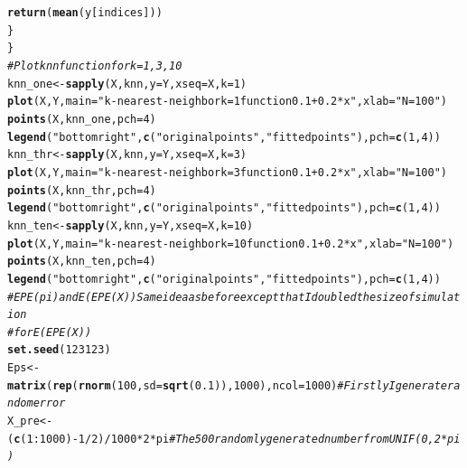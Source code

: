 \documentclass{article}\usepackage[]{graphicx}\usepackage[]{color}
\makeatletter
\newcommand{\hlnum}[1]{\textcolor[rgb]{0.686,0.059,0.569}{#1}}%
\newcommand{\hlstr}[1]{\textcolor[rgb]{0.192,0.494,0.8}{#1}}%
\newcommand{\hlcom}[1]{\textcolor[rgb]{0.678,0.584,0.686}{\textit{#1}}}%
\newcommand{\hlopt}[1]{\textcolor[rgb]{0,0,0}{#1}}%
\newcommand{\hlstd}[1]{\textcolor[rgb]{0.345,0.345,0.345}{#1}}%
\newcommand{\hlkwb}[1]{\textcolor[rgb]{0.69,0.353,0.396}{#1}}%
\newcommand{\hlkwc}[1]{\textcolor[rgb]{0.333,0.667,0.333}{#1}}%
\newcommand{\hlkwd}[1]{\textcolor[rgb]{0.737,0.353,0.396}{\textbf{#1}}}%
\newenvironment{kframe}{%
 \def\at@end@of@kframe{}%
 \ifinner\ifhmode%
  \def\at@end@of@kframe{\end{minipage}}%
  \begin{minipage}{\columnwidth}%
 \fi\fi%
 \def\FrameCommand##1{\hskip\@totalleftmargin \hskip-\fboxsep
 \colorbox{shadecolor}{##1}\hskip-\fboxsep
     \hskip-\linewidth \hskip-\@totalleftmargin \hskip\columnwidth}%
 \MakeFramed {\advance\hsize-\width
   \@totalleftmargin\z@ \linewidth\hsize
   \@setminipage}}%
 {\par\unskip\endMakeFramed%
 \at@end@of@kframe}
\newenvironment{knitrout}{}{} %
\makeatother
\begin{document}
\begin{knitrout}
\begin{kframe}
\begin{alltt}
        \hlkwd{return}\hlstd{(}\hlkwd{mean}\hlstd{(y[indices]))}
    \hlstd{\}}
\hlstd{\}}
\hlcom{# Plot knn function for k = 1,3,10}
\hlstd{knn_one} \hlkwb{<-} \hlkwd{sapply}\hlstd{(X, knn,} \hlkwc{y} \hlstd{= Y,} \hlkwc{xseq} \hlstd{= X,} \hlkwc{k} \hlstd{=} \hlnum{1}\hlstd{)}
\hlkwd{plot}\hlstd{(X, Y,} \hlkwc{main} \hlstd{=} \hlstr{"k-nearest-neighbor k = 1 function 0.1 + 0.2*x"}\hlstd{,} \hlkwc{xlab} \hlstd{=} \hlstr{"N = 100"}\hlstd{)}
\hlkwd{points}\hlstd{(X, knn_one,} \hlkwc{pch} \hlstd{=} \hlnum{4}\hlstd{)}
\hlkwd{legend}\hlstd{(}\hlstr{"bottomright"}\hlstd{,} \hlkwd{c}\hlstd{(}\hlstr{"original points"}\hlstd{,} \hlstr{"fitted points"}\hlstd{),} \hlkwc{pch} \hlstd{=} \hlkwd{c}\hlstd{(}\hlnum{1}\hlstd{,} \hlnum{4}\hlstd{))}
\hlstd{knn_thr} \hlkwb{<-} \hlkwd{sapply}\hlstd{(X, knn,} \hlkwc{y} \hlstd{= Y,} \hlkwc{xseq} \hlstd{= X,} \hlkwc{k} \hlstd{=} \hlnum{3}\hlstd{)}
\hlkwd{plot}\hlstd{(X, Y,} \hlkwc{main} \hlstd{=} \hlstr{"k-nearest-neighbor k = 3 function 0.1 + 0.2*x"}\hlstd{,} \hlkwc{xlab} \hlstd{=} \hlstr{"N = 100"}\hlstd{)}
\hlkwd{points}\hlstd{(X, knn_thr,} \hlkwc{pch} \hlstd{=} \hlnum{4}\hlstd{)}
\hlkwd{legend}\hlstd{(}\hlstr{"bottomright"}\hlstd{,} \hlkwd{c}\hlstd{(}\hlstr{"original points"}\hlstd{,} \hlstr{"fitted points"}\hlstd{),} \hlkwc{pch} \hlstd{=} \hlkwd{c}\hlstd{(}\hlnum{1}\hlstd{,} \hlnum{4}\hlstd{))}
\hlstd{knn_ten} \hlkwb{<-} \hlkwd{sapply}\hlstd{(X, knn,} \hlkwc{y} \hlstd{= Y,} \hlkwc{xseq} \hlstd{= X,} \hlkwc{k} \hlstd{=} \hlnum{10}\hlstd{)}
\hlkwd{plot}\hlstd{(X, Y,} \hlkwc{main} \hlstd{=} \hlstr{"k-nearest-neighbor k = 10 function 0.1 + 0.2*x"}\hlstd{,} \hlkwc{xlab} \hlstd{=} \hlstr{"N = 100"}\hlstd{)}
\hlkwd{points}\hlstd{(X, knn_ten,} \hlkwc{pch} \hlstd{=} \hlnum{4}\hlstd{)}
\hlkwd{legend}\hlstd{(}\hlstr{"bottomright"}\hlstd{,} \hlkwd{c}\hlstd{(}\hlstr{"original points"}\hlstd{,} \hlstr{"fitted points"}\hlstd{),} \hlkwc{pch} \hlstd{=} \hlkwd{c}\hlstd{(}\hlnum{1}\hlstd{,} \hlnum{4}\hlstd{))}
\hlcom{# EPE(pi) and E(EPE(X)) Same idea as before except that I doubled the size of simulation}
\hlcom{# for E(EPE(X))}
\hlkwd{set.seed}\hlstd{(}\hlnum{123123}\hlstd{)}
\hlstd{Eps} \hlkwb{<-} \hlkwd{matrix}\hlstd{(}\hlkwd{rep}\hlstd{(}\hlkwd{rnorm}\hlstd{(}\hlnum{100}\hlstd{,} \hlkwc{sd} \hlstd{=} \hlkwd{sqrt}\hlstd{(}\hlnum{0.1}\hlstd{)),} \hlnum{1000}\hlstd{),} \hlkwc{ncol} \hlstd{=} \hlnum{1000}\hlstd{)}  \hlcom{# Firstly I generate random error}
\hlstd{X_pre} \hlkwb{<-} \hlstd{(}\hlkwd{c}\hlstd{(}\hlnum{1}\hlopt{:}\hlnum{1000}\hlstd{)} \hlopt{-} \hlnum{1}\hlopt{/}\hlnum{2}\hlstd{)}\hlopt{/}\hlnum{1000} \hlopt{*} \hlnum{2} \hlopt{*} \hlstd{pi}  \hlcom{# The 500 randomly generated number from        UNIF(0, 2*pi)}

\end{alltt}
\end{kframe}
\end{knitrout}
\end{document}
